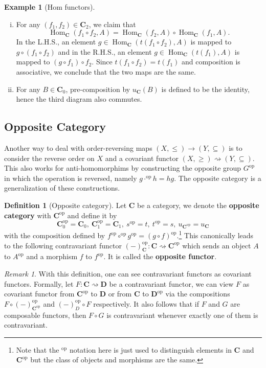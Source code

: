 \documentclass{article}
\theoremstyle{definition}
\newtheorem{defn}[thm]{Definition}
\newtheorem{exmp}[thm]{Example}
\theoremstyle{remark}
\newtheorem{rem}[thm]{Remark}
\DeclareMathOperator{\Hom}{Hom}
\newcommand{\op}[1]{#1^{\text{op}}}
\begin{document}
\begin{exmp}[Hom functors]
\begin{enumerate}
\begin{enumerate}[i.]
			\item For any $(f_1,f_2) \in \mathbf{C}_2$, we claim that \[\Hom_{\mathbf{C}}(f_1\circ f_2,A) = \Hom_{\mathbf{C}}(f_2,A)\circ \Hom_{\mathbf{C}}(f_1,A).\] In the L.H.S., an element $g \in \Hom_{\mathbf{C}}(t(f_1\circ f_2),A)$ is mapped to $g\circ (f_1 \circ f_2)$ and in the R.H.S., an element $g \in \Hom_{\mathbf{C}}(t(f_1),A)$ is mapped to $(g\circ f_1) \circ f_2$. Since $t(f_1 \circ f_2) = t(f_1)$ and composition is associative, we conclude that the two maps are the same.
			\item For any $B \in \mathbf{C}_0$, pre-composition by $u_{\mathbf{C}}(B)$ is defined to be the identity, hence the third diagram also commutes.
		\end{enumerate}
	\end{enumerate}
\end{exmp}
\subsection{Opposite Category}
Another way to deal with order-reversing maps $(X, \leq) \rightarrow (Y, \subseteq)$ is to consider the reverse order on $X$ and a covariant functor $(X, \geq) \rightsquigarrow (Y, \subseteq)$. This also works for anti-homomorphims by constructing the opposite group $\op{G}$ in which the operation is reversed, namely $g\op{\cdot} h = hg$. The opposite category is a generalization of these constructions.

\begin{defn}[Opposite category]
	Let $\mathbf{C}$ be a category, we denote the \textbf{opposite category} with $\op{\mathbf{C}}$ and define it by 
	\[ \op{\mathbf{C}}_0 = \mathbf{C}_0,\ \op{\mathbf{C}}_1 = \mathbf{C}_1,\ \op{s} = t,\ \op{t} = s,\ u_{\op{\mathbf{C}}} = u_{\mathbf{C}}\]
	with the composition defined by $\op{f}\op{\circ}\op{g} = \op{(g\circ f)}$.\footnote{Note that the $\op{}$ notation here is just used to distinguish elements in $\mathbf{C}$ and $\op{\mathbf{C}}$ but the class of objects and morphisms are the same.} This canonically leads to the following contravariant functor $\op{(-)}_{\mathbf{C}}: \mathbf{C} \rightsquigarrow \op{\mathbf{C}}$ which sends an object $A$ to $\op{A}$ and a morphism $f$ to $\op{f}$. It is called the \textbf{opposite functor}.
\end{defn}
\begin{rem}
	With this definition, one can see contravariant functors as covariant functors. Formally, let $F:\mathbf{C}\rightsquigarrow \mathbf{D}$ be a contravariant functor, we can view $F$ as covariant functor from $\op{\mathbf{C}}$ to $\mathbf{D}$ or from $\mathbf{C}$ to $\op{\mathbf{D}}$ via the compositions $F\circ \op{(-)}_{\op{\mathbf{C}}}$ and $\op{(-)}_{D}\circ F$ respectively. It also follows that if $F$ and $G$ are composable functors, then $F\circ G$ is contravariant whenever exactly one of them is contravariant.
\end{rem}
\end{document}
